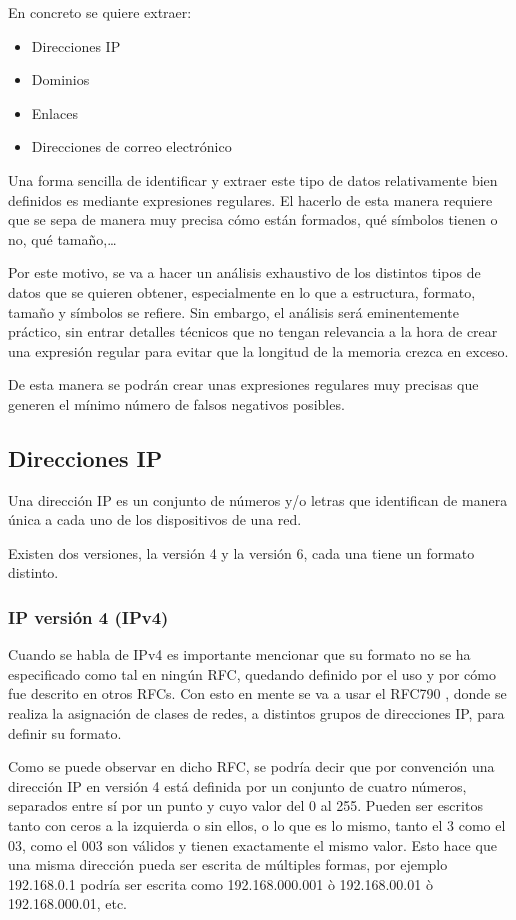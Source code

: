 En concreto se quiere extraer: 
\begin{itemize}
    \item Direcciones IP
    \item Dominios
    \item Enlaces 
    \item Direcciones de correo electrónico
\end{itemize}

Una forma sencilla de identificar y extraer este tipo de datos relativamente bien definidos es mediante expresiones regulares. El hacerlo de esta manera requiere que se sepa de manera muy precisa cómo están formados, qué símbolos tienen o no, qué tamaño,…

Por este motivo, se va a hacer un análisis exhaustivo de los distintos tipos de datos que se quieren obtener, especialmente en lo que a estructura, formato, tamaño y símbolos se refiere. Sin embargo, el análisis será eminentemente práctico, sin entrar detalles técnicos que no tengan relevancia a la hora de crear una expresión regular para evitar que la longitud de la memoria crezca en exceso. 

De esta manera se podrán crear unas expresiones regulares muy precisas que generen el mínimo número de falsos negativos posibles.

\subsection{Direcciones IP}
Una dirección IP es un conjunto de números y/o letras que identifican de manera única a cada uno de los dispositivos de una red. 

Existen dos versiones, la versión 4 y la versión 6, cada una tiene un formato distinto. \cite{ipv4_v6}

\subsubsection{IP versión 4 (IPv4)}\label{subsec:ipv4}
Cuando se habla de IPv4 es importante mencionar que su formato no se ha especificado como tal en ningún RFC, quedando definido por el uso y por cómo fue descrito en otros RFCs. Con esto en mente se va a usar el RFC790 \cite{rfc790}, donde se realiza la asignación de clases de redes, a distintos grupos de direcciones IP, para definir su formato. 

Como se puede observar en dicho RFC, se podría decir que por convención una dirección IP en versión 4 está definida por un conjunto de cuatro números, separados entre sí por un punto y cuyo valor del 0 al 255. Pueden ser escritos tanto con ceros a la izquierda o sin ellos, o lo que es lo mismo, tanto el 3 como el 03, como el 003 son válidos y tienen exactamente el mismo valor. Esto hace que una misma dirección pueda ser escrita de múltiples formas, por ejemplo 192.168.0.1 podría ser escrita como 192.168.000.001 ò 192.168.00.01 ò 192.168.000.01, etc. 
 



